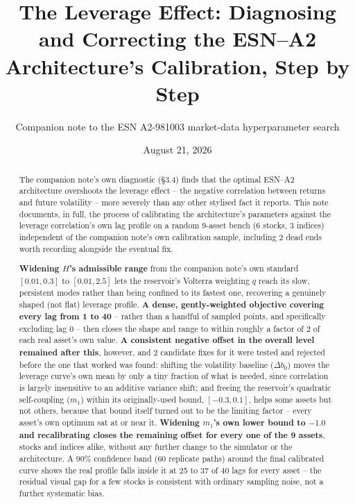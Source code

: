 \documentclass[11pt]{article}
\title{The Leverage Effect: Diagnosing and Correcting the ESN--A2\\
Architecture's Calibration, Step by Step}
\author{Companion note to the ESN A2-981003 market-data hyperparameter search}
\date{August 21, 2026}
\begin{document}
\maketitle

\begin{abstract}
The companion note's own diagnostic (\S3.4) finds that the optimal ESN--A2
architecture overshoots the leverage effect -- the negative correlation
between returns and future volatility -- more severely than any other
stylised fact it reports. This note documents, in full, the process of
calibrating the architecture's parameters against the leverage correlation's
own lag profile on a random 9-asset bench (6 stocks, 3 indices) independent
of the companion note's own calibration sample, including 2 dead ends worth
recording alongside the eventual fix.

\textbf{Widening $H$'s admissible range} from the companion note's own
standard $[0.01,0.3]$ to $[0.01,2.5]$ lets the reservoir's Volterra weighting
$q$ reach its slow, persistent modes rather than being confined to its
fastest one, recovering a genuinely shaped (not flat) leverage profile.
\textbf{A dense, gently-weighted objective covering every lag from 1 to 40}
-- rather than a handful of sampled points, and specifically excluding lag 0
-- then closes the shape and range to within roughly a factor of 2 of each
real asset's own value. \textbf{A consistent negative offset in the overall
level remained after this}, however, and 2 candidate fixes for it were tested
and rejected before the one that worked was found: shifting the volatility
baseline ($\Delta b_0$) moves the leverage curve's own mean by only a tiny
fraction of what is needed, since correlation is largely insensitive to an
additive variance shift; and freeing the reservoir's quadratic self-coupling
($m_1$) within its originally-used bound, $[-0.3,0.1]$, helps some assets but
not others, because that bound itself turned out to be the limiting factor --
every asset's own optimum sat at or near it. \textbf{Widening $m_1$'s own
lower bound to $-1.0$ and recalibrating closes the remaining offset for
every one of the 9 assets}, stocks and indices alike, without any further
change to the simulator or the architecture. A $90\%$ confidence band (60
replicate paths) around the final calibrated curve shows the real profile
falls inside it at 25 to 37 of 40 lags for every asset -- the residual
visual gap for a few stocks is consistent with ordinary sampling noise,
not a further systematic bias.
\end{abstract}
\end{document}

